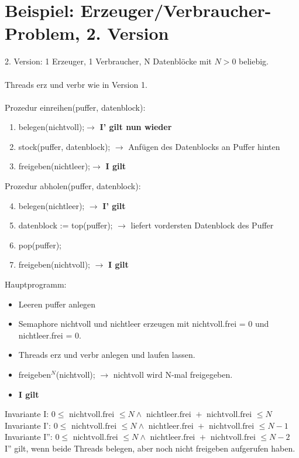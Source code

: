 \section[Beispiel: Erzeuger/Verbraucher (2)]{Beispiel: Erzeuger/Verbraucher-Problem, 2. Version}
2. Version: 1 Erzeuger, 1 Verbraucher, N Datenblöcke mit $ N > 0 $ beliebig.\\
\\
Threads erz und verbr wie in Version 1.\\
\\
Prozedur einreihen(puffer, datenblock):
\begin{enumerate}
\item belegen(nichtvoll);$ \rightarrow $ \textbf{I' gilt nun wieder}
\item stock(puffer, datenblock); $ \rightarrow $ Anfügen des Datenblocks an Puffer hinten
\item freigeben(nichtleer);$ \rightarrow $ \textbf{I gilt}
\end{enumerate}
Prozedur abholen(puffer, datenblock):
\begin{enumerate}
\setcounter{enumi}{3}
\item belegen(nichtleer); $\rightarrow$ \textbf{I' gilt}
\item datenblock := top(puffer); $ \rightarrow $ liefert vordersten Datenblock des Puffer
\item pop(puffer);
\item freigeben(nichtvoll); $\rightarrow$ \textbf{I gilt}
\end{enumerate}
Hauptprogramm:
\begin{itemize}
\item Leeren puffer anlegen
\item Semaphore nichtvoll und nichtleer erzeugen mit nichtvoll.frei = 0 und nichtleer.frei = 0.
\item Threads erz und verbr anlegen und laufen lassen.
\item freigeben$^N$(nichtvoll); $\rightarrow$ nichtvoll wird N-mal freigegeben. 
\item \textbf{I gilt}
\end{itemize}

Invariante I: $ 0 \leq \text{ nichtvoll.frei } \leq N \land \text{ nichtleer.frei } + \text{ nichtvoll.frei } \leq N $\\
Invariante I': $ 0 \leq \text{ nichtvoll.frei } \leq N \land \text{ nichtleer.frei } + \text{ nichtvoll.frei } \leq N - 1 $\\
Invariante I'': $ 0 \leq \text{ nichtvoll.frei } \leq N \land \text{ nichtleer.frei } + \text{ nichtvoll.frei } \leq N - 2 $\\
I'' gilt, wenn beide Threads belegen, aber noch nicht freigeben aufgerufen haben.

